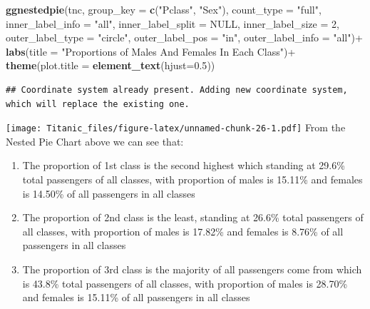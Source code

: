 \documentclass[
]{article}
\newenvironment{Shaded}{\begin{snugshade}}{\end{snugshade}}
\newcommand{\AttributeTok}[1]{\textcolor[rgb]{0.74,0.68,0.62}{#1}}
\newcommand{\ConstantTok}[1]{\textcolor[rgb]{0.74,0.68,0.62}{#1}}
\newcommand{\DecValTok}[1]{\textcolor[rgb]{0.27,0.67,0.26}{#1}}
\newcommand{\FloatTok}[1]{\textcolor[rgb]{0.27,0.67,0.26}{#1}}
\newcommand{\FunctionTok}[1]{\textcolor[rgb]{1.00,0.58,0.35}{\textbf{#1}}}
\newcommand{\NormalTok}[1]{\textcolor[rgb]{0.74,0.68,0.62}{#1}}
\newcommand{\SpecialCharTok}[1]{\textcolor[rgb]{0.02,0.61,0.04}{#1}}
\newcommand{\StringTok}[1]{\textcolor[rgb]{0.02,0.61,0.04}{#1}}
\begin{document}
\begin{Shaded}
\begin{Highlighting}[]
\FunctionTok{ggnestedpie}\NormalTok{(tnc, }\AttributeTok{group\_key =} \FunctionTok{c}\NormalTok{(}\StringTok{"Pclass"}\NormalTok{, }\StringTok{"Sex"}\NormalTok{), }\AttributeTok{count\_type =} \StringTok{"full"}\NormalTok{,}
            \AttributeTok{inner\_label\_info =} \StringTok{"all"}\NormalTok{, }
            \AttributeTok{inner\_label\_split =} \ConstantTok{NULL}\NormalTok{,}
            \AttributeTok{inner\_label\_size =} \DecValTok{2}\NormalTok{,}
            \AttributeTok{outer\_label\_type =} \StringTok{"circle"}\NormalTok{, }
            \AttributeTok{outer\_label\_pos =} \StringTok{"in"}\NormalTok{, }
            \AttributeTok{outer\_label\_info =} \StringTok{"all"}\NormalTok{)}\SpecialCharTok{+}
  \FunctionTok{labs}\NormalTok{(}\AttributeTok{title =} \StringTok{"Proportions of Males And Females In Each Class"}\NormalTok{)}\SpecialCharTok{+}
  \FunctionTok{theme}\NormalTok{(}\AttributeTok{plot.title =} \FunctionTok{element\_text}\NormalTok{(}\AttributeTok{hjust=}\FloatTok{0.5}\NormalTok{))}
\end{Highlighting}
\end{Shaded}

\begin{verbatim}
## Coordinate system already present. Adding new coordinate system, which will replace the existing one.
\end{verbatim}

\texttt{[image: Titanic\_files/figure-latex/unnamed-chunk-26-1.pdf]} From
the Nested Pie Chart above we can see that:

\begin{enumerate}
\def\labelenumi{\arabic{enumi}.}
\item
  The proportion of 1st class is the second highest which standing at
  29.6\% total passengers of all classes, with proportion of males is
  15.11\% and females is 14.50\% of all passengers in all classes
\item
  The proportion of 2nd class is the least, standing at 26.6\% total
  passengers of all classes, with proportion of males is 17.82\% and
  females is 8.76\% of all passengers in all classes
\item
  The proportion of 3rd class is the majority of all passengers come
  from which is 43.8\% total passengers of all classes, with proportion
  of males is 28.70\% and females is 15.11\% of all passengers in all
  classes
\end{enumerate}
\end{document}

